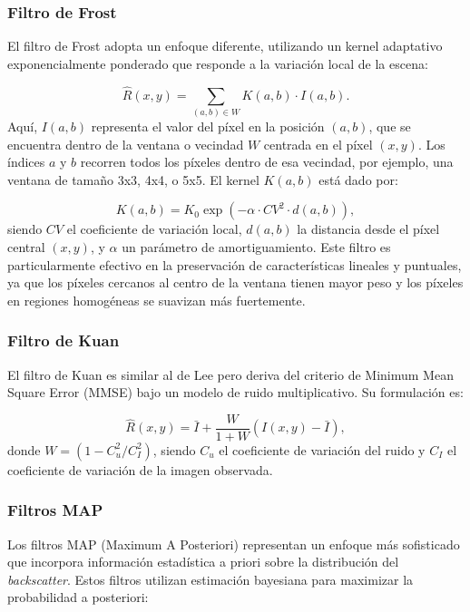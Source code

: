 \subsubsection{Filtro de Frost}

El filtro de Frost \cite{frost1982model} adopta un enfoque diferente, utilizando un kernel adaptativo exponencialmente ponderado que responde a la variación local de la escena:

\begin{equation}
	\hat{R}(x,y) = \sum_{(a,b) \in W} K(a,b) \cdot I(a,b).
\end{equation}
Aquí, $I(a,b)$ representa el valor del píxel en la posición $(a,b)$, que se encuentra dentro de la ventana o vecindad $W$ centrada en el píxel $(x,y)$. Los índices $a$ y $b$ recorren todos los píxeles dentro de esa vecindad, por ejemplo, una ventana de tamaño 3x3, 4x4, o 5x5. El kernel $K(a,b)$ está dado por:

\begin{equation}
	K(a,b) = K_0 \exp(-\alpha \cdot CV^2 \cdot d(a,b)),
\end{equation}
siendo $CV$ el coeficiente de variación local, $d(a,b)$ la distancia desde el píxel central $(x,y)$, y $\alpha$ un parámetro de amortiguamiento. Este filtro es particularmente efectivo en la preservación de características lineales y puntuales, ya que los píxeles cercanos al centro de la ventana tienen mayor peso y los píxeles en regiones homogéneas se suavizan más fuertemente.

\subsubsection{Filtro de Kuan}

El filtro de Kuan \cite{kuan1987adaptive} es similar al de Lee pero deriva del criterio de Minimum Mean Square Error (MMSE) bajo un modelo de ruido multiplicativo. Su formulación es:

\begin{equation}
	\hat{R}(x,y) = \bar{I} + \frac{W}{1+W}(I(x,y) - \bar{I}),
\end{equation}
donde $W = (1 - C_u^2/C_I^2)$, siendo $C_u$ el coeficiente de variación del ruido y $C_I$ el coeficiente de variación de la imagen observada.

\subsubsection{Filtros MAP}

Los filtros MAP (Maximum A Posteriori) \cite{lopes1993maximum} representan un enfoque más sofisticado que incorpora información estadística a priori sobre la distribución del \emph{backscatter}. Estos filtros utilizan estimación bayesiana para maximizar la probabilidad a posteriori:

